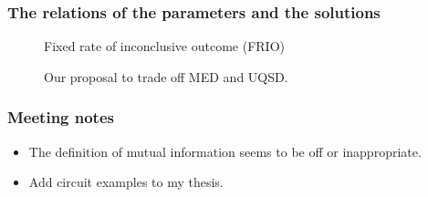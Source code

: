 \documentclass{beamer}
\begin{document}
\begin{frame}
    \frametitle{The relations of the parameters and the solutions}

    \centering
    \begin{figure}
        
        \caption{Fixed rate of inconclusive outcome (FRIO)}
    \end{figure}

    \begin{figure}
        
        \caption{Our proposal to trade off MED and UQSD.}
    \end{figure}
\end{frame}

\begin{frame}
    \frametitle{Meeting notes}
    \begin{itemize}
        \item The definition of mutual information seems to be off or inappropriate.
        \item Add circuit examples to my thesis.
    \end{itemize}
\end{frame}
\end{document}
